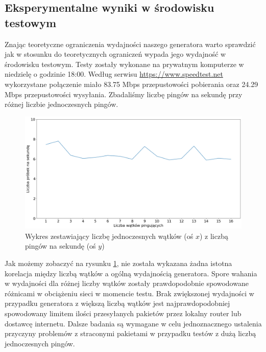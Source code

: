 \subsection{Eksperymentalne wyniki w środowisku testowym}
Znając teoretyczne ograniczenia wydajności naszego generatora warto sprawdzić jak w stosunku do teoretycznych ograniczeń wypada jego wydajność w środowisku testowym. Testy zostały wykonane na prywatnym komputerze w niedzielę o godzinie 18:00. Według serwisu \url{https://www.speedtest.net} wykorzystane połączenie miało 83.75 Mbps przepustowości pobierania oraz 24.29 Mbps przepustowości wysyłania. Zbadaliśmy liczbę pingów na sekundę przy różnej liczbie jednoczesnych pingów. 
\begin{figure}[!htp]
    \centering
    \includegraphics[width=15cm]{performance}
    \caption{Wykres zestawiający liczbę jednoczesnych wątków (oś $x$) z liczbą pingów na sekundę (oś $y$)}
    \label{fig:performance}
\end{figure}
Jak możemy zobaczyć na rysunku \ref{fig:performance}, nie została wykazana żadna istotna korelacja między liczbą wątków a ogólną wydajnością generatora. Spore wahania w wydajności dla różnej liczby wątków zostały prawdopodobnie spowodowane różnicami w obciążeniu sieci w momencie testu. Brak zwiększonej wydajności w przypadku generatora z większą liczbą wątków jest najprawdopodobniej spowodowany limitem ilości przesyłanych pakietów przez lokalny router lub dostawcę internetu. Dalsze badania są wymagane w celu jednoznacznego ustalenia przyczyny problemów z straconymi pakietami w przypadku testów z dużą liczbą jednoczesnych pingów.